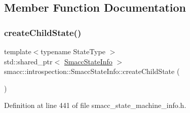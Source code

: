 \subsection{Member Function Documentation}
\mbox{\label{classsmacc_1_1introspection_1_1SmaccStateInfo_a287664f0ac1c0380bad11ef6973cde8d}} 
\subsubsection{\texorpdfstring{create\+Child\+State()}{createChildState()}}
{\footnotesize\ttfamily template$<$typename State\+Type $>$ \\
std\+::shared\+\_\+ptr$<$ \hyperlink{classsmacc_1_1introspection_1_1SmaccStateInfo}{Smacc\+State\+Info} $>$ smacc\+::introspection\+::\+Smacc\+State\+Info\+::create\+Child\+State (\begin{DoxyParamCaption}{ }\end{DoxyParamCaption})}



Definition at line 441 of file smacc\+\_\+state\+\_\+machine\+\_\+info.\+h.


